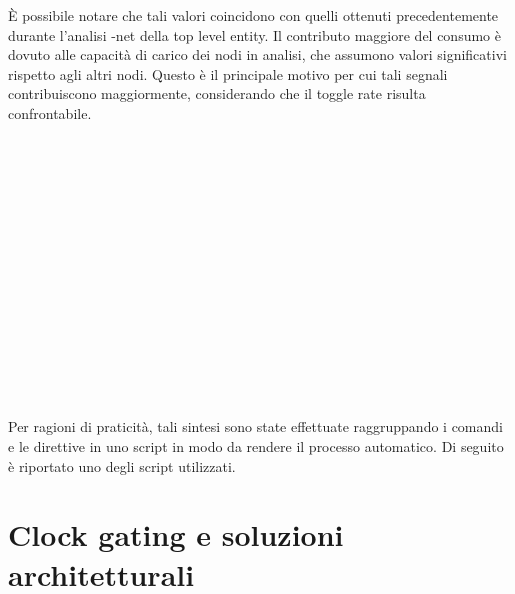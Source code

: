 \documentclass[11pt,  english, makeidx, a4paper, titlepage, oneside]{book}
\newenvironment{listato}{\footnotesize} {\normalsize }
\begin{document}
\vspace{0.3cm}
È possibile notare che tali valori coincidono con quelli ottenuti precedentemente durante l'analisi -net della top level entity. Il contributo maggiore del consumo è dovuto alle capacità di carico dei nodi in analisi, che assumono  valori significativi rispetto agli altri nodi. Questo è il principale motivo per cui tali segnali contribuiscono maggiormente, considerando che il toggle rate risulta confrontabile.
\\\\\\\\\\\\\\\\\\\\\\\\\\\\\\\\
Per ragioni di praticità, tali sintesi sono state effettuate raggruppando i comandi e le direttive in uno script in modo da rendere il processo automatico. Di seguito è riportato uno degli script utilizzati.
\begin{center}
\begin{listato}
	\centerline{}
\end{listato}
\end{center}

\chapter{Clock gating e soluzioni architetturali}
\end{document}
